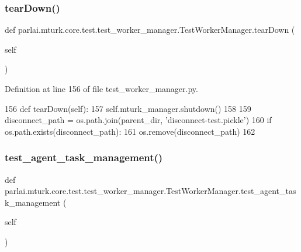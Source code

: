 \subsubsection{\texorpdfstring{tear\+Down()}{tearDown()}}
{\footnotesize\ttfamily def parlai.\+mturk.\+core.\+test.\+test\+\_\+worker\+\_\+manager.\+Test\+Worker\+Manager.\+tear\+Down (\begin{DoxyParamCaption}\item[{}]{self }\end{DoxyParamCaption})}



Definition at line 156 of file test\+\_\+worker\+\_\+manager.\+py.


\begin{DoxyCode}
156     \textcolor{keyword}{def }tearDown(self):
157         self.mturk\_manager.shutdown()
158 
159         disconnect\_path = os.path.join(parent\_dir, \textcolor{stringliteral}{'disconnect-test.pickle'})
160         \textcolor{keywordflow}{if} os.path.exists(disconnect\_path):
161             os.remove(disconnect\_path)
162 
\end{DoxyCode}
\mbox{\label{classparlai_1_1mturk_1_1core_1_1test_1_1test__worker__manager_1_1TestWorkerManager_acaf2cadff98971660268aaaa45f8a57c}} 
\subsubsection{\texorpdfstring{test\+\_\+agent\+\_\+task\+\_\+management()}{test\_agent\_task\_management()}}
{\footnotesize\ttfamily def parlai.\+mturk.\+core.\+test.\+test\+\_\+worker\+\_\+manager.\+Test\+Worker\+Manager.\+test\+\_\+agent\+\_\+task\+\_\+management (\begin{DoxyParamCaption}\item[{}]{self }\end{DoxyParamCaption})}

